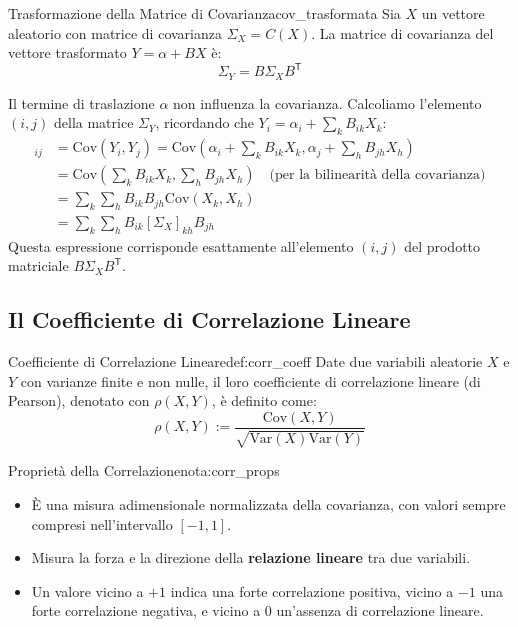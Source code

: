 \begin{proposizione}{Trasformazione della Matrice di Covarianza}{cov_trasformata}
Sia \(X\) un vettore aleatorio con matrice di covarianza \(\Sigma_X = C(X)\). La matrice di covarianza del vettore trasformato \(Y = \alpha + BX\) è:
\[
\Sigma_Y = B \Sigma_X B^\mathsf{T}
\]
\end{proposizione}
\begin{dimostrazione}{}{}
Il termine di traslazione \(\alpha\) non influenza la covarianza. Calcoliamo l'elemento \((i, j)\) della matrice \(\Sigma_Y\), ricordando che \(Y_i = \alpha_i + \sum_k B_{ik}X_k\):
\begin{align*}
    [\Sigma_Y]_{ij} &= \text{Cov}(Y_i, Y_j) = \text{Cov}\left(\alpha_i + \sum_k B_{ik}X_k, \alpha_j + \sum_h B_{jh}X_h\right) \\
    &= \text{Cov}\left(\sum_k B_{ik}X_k, \sum_h B_{jh}X_h\right) \quad \text{(per la bilinearità della covarianza)} \\
    &= \sum_k \sum_h B_{ik} B_{jh} \text{Cov}(X_k, X_h) \\
    &= \sum_k \sum_h B_{ik} [\Sigma_X]_{kh} B_{jh}
\end{align*}
Questa espressione corrisponde esattamente all'elemento \((i, j)\) del prodotto matriciale \(B \Sigma_X B^\mathsf{T}\).
\end{dimostrazione}

\subsection{Il Coefficiente di Correlazione Lineare}

\begin{definizione}{Coefficiente di Correlazione Lineare}{def:corr_coeff}
Date due variabili aleatorie \(X\) e \(Y\) con varianze finite e non nulle, il loro coefficiente di correlazione lineare (di Pearson), denotato con \(\rho(X,Y)\), è definito come:
\[
\rho(X,Y) := \frac{\text{Cov}(X,Y)}{\sqrt{\text{Var}(X)\text{Var}(Y)}}
\]
\end{definizione}

\begin{nota}{Proprietà della Correlazione}{nota:corr_props}
\begin{itemize}
    \item È una misura adimensionale normalizzata della covarianza, con valori sempre compresi nell'intervallo \([-1, 1]\).
    \item Misura la forza e la direzione della \textbf{relazione lineare} tra due variabili.
    \item Un valore vicino a \(+1\) indica una forte correlazione positiva, vicino a \(-1\) una forte correlazione negativa, e vicino a \(0\) un'assenza di correlazione lineare.
\end{itemize}
\end{nota}

